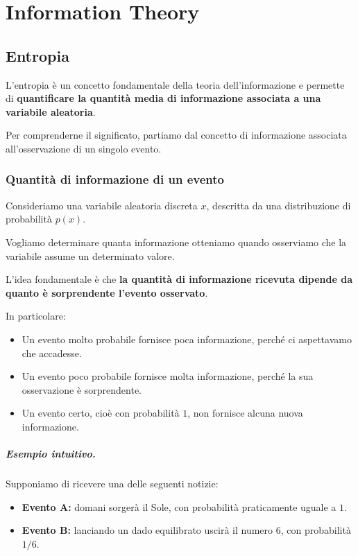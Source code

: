 \chapter{Information Theory}
\section{Entropia}

L'entropia è un concetto fondamentale della teoria dell'informazione e permette di \textbf{quantificare la quantità media di informazione associata a una variabile aleatoria}.

Per comprenderne il significato, partiamo dal concetto di informazione associata all'osservazione di un singolo evento.

\subsection{Quantità di informazione di un evento}

Consideriamo una variabile aleatoria discreta $x$, descritta da una distribuzione di probabilità $p(x)$.

Vogliamo determinare quanta informazione otteniamo quando osserviamo che la variabile assume un determinato valore.

L'idea fondamentale è che \textbf{la quantità di informazione ricevuta dipende da quanto è sorprendente l'evento osservato}.

In particolare:
\begin{itemize}
    \item Un evento molto probabile fornisce poca informazione, perché ci aspettavamo che accadesse.
    \item Un evento poco probabile fornisce molta informazione, perché la sua osservazione è sorprendente.
    \item Un evento certo, cioè con probabilità $1$, non fornisce alcuna nuova informazione.
\end{itemize}

\paragraph{Esempio intuitivo.}

Supponiamo di ricevere una delle seguenti notizie:
\begin{itemize}
    \item \textbf{Evento A:} domani sorgerà il Sole, con probabilità praticamente uguale a $1$.
    \item \textbf{Evento B:} lanciando un dado equilibrato uscirà il numero $6$, con probabilità $1/6$.
\end{itemize}

